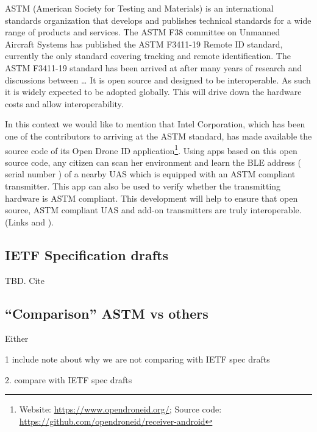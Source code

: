 \documentclass{ua_wgs_base}
\begin{document}
ASTM (American Society for Testing and Materials) is an international
standards organization that develops and publishes technical standards
for a wide range of products and services. The ASTM F38 committee
on Unmanned Aircraft Systems has published the ASTM F3411-19 Remote
ID standard, currently the only standard covering tracking and remote
identification. The ASTM F3411-19 standard has been arrived at after
many years of research and discussions between \dots{} It is open
source and designed to be interoperable. As such it is widely expected
to be adopted globally. This will drive down the hardware costs and
allow interoperability.

In this context we would like to mention that Intel Corporation, which
has been one of the contributors to arriving at the ASTM standard,
has made available the source code of its Open Drone ID application\footnote{Website: \href{https://www.opendroneid.org/}{https://www.opendroneid.org/};
Source code: \href{https://github.com/opendroneid/receiver-android}{https://github.com/opendroneid/receiver-android}}. Using apps based on this open source code, any citizen can scan
her environment and learn the BLE address ( serial number ) of a nearby
UAS which is equipped with an ASTM compliant transmitter. This app
can also be used to verify whether the transmitting hardware is ASTM
compliant. This development will help to ensure that open source,
ASTM compliant UAS and add-on transmitters are truly interoperable.
(Links and ).


\subsection{IETF Specification drafts}

\begin{lyxgreyedout}
TBD. Cite \cite{IETF-DRIP-arch-draft,IETF-DRIP-reqs-draft,IETF-crowd-sourced-rid-draft,IETF-uas-rid-draft,IETF-drip-identity-draft,IETF-drip-operator-privacy-draft,IETF-drip-secure-transport-draft,IETF-drip-auth-draft}%
\end{lyxgreyedout}


\subsection{``Comparison'' ASTM vs others}

\begin{lyxgreyedout}
Either 

1 include note about why we are not comparing with IETF spec drafts

2. compare with IETF spec drafts%
\end{lyxgreyedout}
\end{document}
